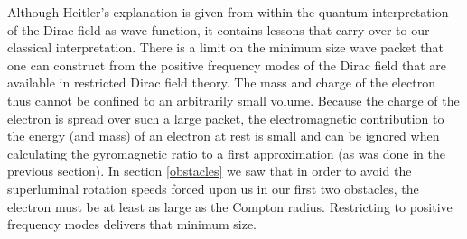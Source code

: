\documentclass[12pt,secnumarabic,amsmath,amssymb,balancelastpage,nofootinbib]{article}
\begin{document}
Although Heitler's explanation is given from within the quantum interpretation of the Dirac field as wave function, it contains lessons that carry over to our classical interpretation.  There is a limit on the minimum size wave packet that one can construct from the positive frequency modes of the Dirac field that are available in restricted Dirac field theory.  The mass and charge of the electron thus cannot be confined to an arbitrarily small volume.  Because the charge of the electron is spread over such a large packet, the electromagnetic contribution to the energy (and mass) of an electron at rest is small and can be ignored when calculating the gyromagnetic ratio to a first approximation (as was done in the previous section).  In section \ref{obstacles} we saw that in order to avoid the superluminal rotation speeds forced upon us in our first two obstacles, the electron must be at least as large as the Compton radius.  Restricting to positive frequency modes delivers that minimum size.
\end{document}
